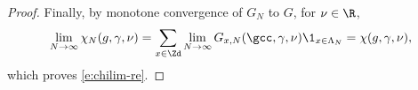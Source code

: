 \begin{proof}
Finally, by monotone convergence of $G_N$ to $G$,
for $\nu \in \R$,
\begin{equation}
\lim_{N\to\infty} \chi_N(g, \gamma, \nu)
    = \sum_{x\in\Zd} \lim_{N\to\infty} G_{x,N}(\gcc,\gamma,\nu) \1_{x\in\Lambda_N}
    = \chi(g, \gamma, \nu),
\end{equation}
which proves \eqref{e:chilim-re}.
\end{proof}